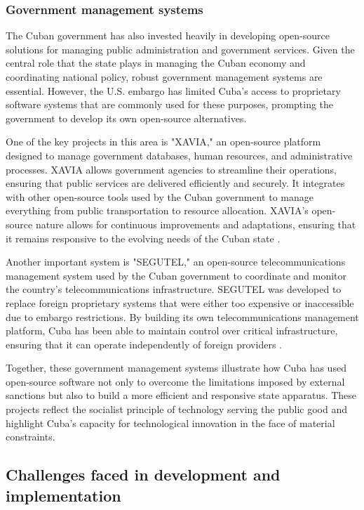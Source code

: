\begin{refsection}
\subsubsection{Government management systems}

The Cuban government has also invested heavily in developing open-source solutions for managing public administration and government services. Given the central role that the state plays in managing the Cuban economy and coordinating national policy, robust government management systems are essential. However, the U.S. embargo has limited Cuba’s access to proprietary software systems that are commonly used for these purposes, prompting the government to develop its own open-source alternatives.

One of the key projects in this area is "XAVIA," an open-source platform designed to manage government databases, human resources, and administrative processes. XAVIA allows government agencies to streamline their operations, ensuring that public services are delivered efficiently and securely. It integrates with other open-source tools used by the Cuban government to manage everything from public transportation to resource allocation. XAVIA’s open-source nature allows for continuous improvements and adaptations, ensuring that it remains responsive to the evolving needs of the Cuban state \cite[pp.~23-45]{kapcia}.

Another important system is "SEGUTEL," an open-source telecommunications management system used by the Cuban government to coordinate and monitor the country’s telecommunications infrastructure. SEGUTEL was developed to replace foreign proprietary systems that were either too expensive or inaccessible due to embargo restrictions. By building its own telecommunications management platform, Cuba has been able to maintain control over critical infrastructure, ensuring that it can operate independently of foreign providers \cite[pp.~56-87]{perez}.

Together, these government management systems illustrate how Cuba has used open-source software not only to overcome the limitations imposed by external sanctions but also to build a more efficient and responsive state apparatus. These projects reflect the socialist principle of technology serving the public good and highlight Cuba’s capacity for technological innovation in the face of material constraints.

\subsection{Challenges faced in development and implementation}


\end{refsection}
